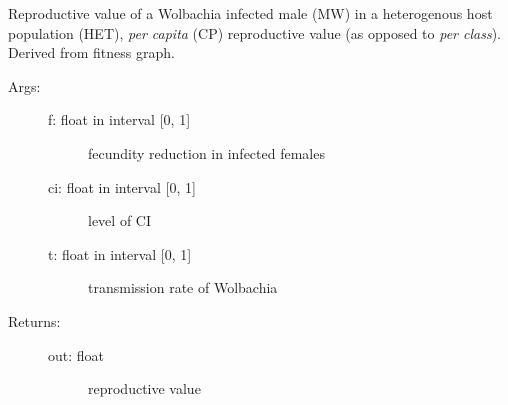 \documentclass[letterpaper,10pt,english]{sphinxmanual}
\begin{document}
\begin{fulllineitems}
\label{index:wspec.analytical.reproval_MWHETCP}
Reproductive value of a Wolbachia infected male (MW) in a 
heterogenous host population (HET), \emph{per capita} (CP) reproductive 
value (as opposed to \emph{per class}). Derived from fitness graph.
\begin{description}
\item[{Args:}] \leavevmode\begin{description}
\item[{f: float in interval {[}0, 1{]}}] \leavevmode
fecundity reduction in infected females

\item[{ci: float in interval {[}0, 1{]}}] \leavevmode
level of CI

\item[{t: float in interval {[}0, 1{]}}] \leavevmode
transmission rate of Wolbachia

\end{description}

\item[{Returns:}] \leavevmode\begin{description}
\item[{out: float}] \leavevmode
reproductive value

\end{description}

\end{description}

\end{fulllineitems}

\end{document}
